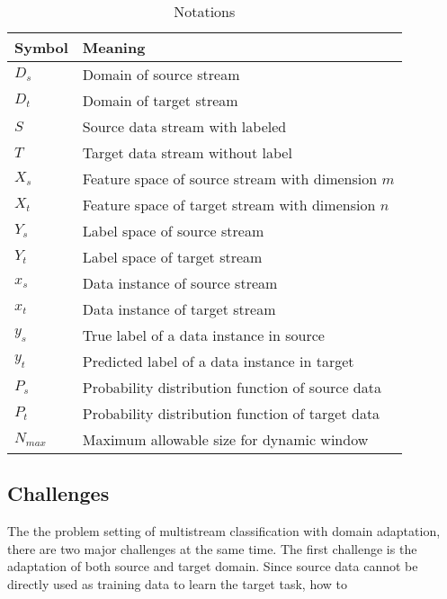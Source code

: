 \begin{table}[H]
\centering
\caption{Notations}
\label{tab:notations}
\begin{tabular}{|l|l|}
\hline
Symbol & Meaning \\ \hline
 $D_{s}$ & Domain of source stream \\ \hline
 $D_{t}$ & Domain of target stream \\ \hline
 $S$ & Source data stream with labeled \\ \hline
 $T$ & Target data stream without label \\ \hline
 $X_{s}$ & Feature space of source stream with dimension $m$ \\ \hline
 $X_{t}$ & Feature space of target stream with dimension $n$ \\ \hline
 $Y_{s}$ & Label space of source stream \\ \hline
 $Y_{t}$ & Label space of target stream \\ \hline
 $x_{s}$ & Data instance of source stream \\ \hline
 $x_{t}$ & Data instance of target stream \\ \hline
 $y_{s}$ & True label of a data instance in source \\ \hline
 $y_{t}$ & Predicted label of a data instance in target \\ \hline
 $P_{s}$ & Probability distribution function of source data \\ \hline 
 $P_{t}$ & Probability distribution function of target data \\ \hline
 $N_{max}$ & Maximum allowable size for dynamic window \\ \hline
\end{tabular}
\end{table}

\subsection{Challenges}
The the problem setting of multistream classification with domain adaptation, there are two major challenges at the same time.
The first challenge is the adaptation of both source and target domain. Since source data cannot be directly used as training data to learn the target task, 
how to 


